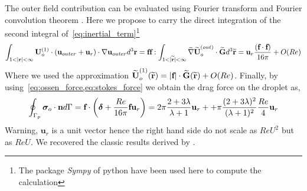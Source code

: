 The outer field contribution can be evaluated using Fourier transform and Fourier convolution theorem \citep{stone2001inertial}. 
Here we propose to carry the direct integration of the second integral of~\ref{eq:inertial_term}\footnote{The package \textit{Sympy} of python have been used here to compute the calculation} 
\begin{equation}
    \int_{1<|\textbf{r}|<\infty}{
    \textbf{U}_{o}^{(1)}\cdot 
    (\textbf{u}_{outer} + \textbf{u}_r)\cdot \grad \textbf{u}_{outer}
    }d^3\textbf{r} 
    =
    \textbf{f} \textbf{f} : \int_{1<|\wt{\textbf{r}}|<\infty}{
    \wt{\grad} \wt{\textbf{U}}_{o}^{(out)}\cdot \wt{\textbf{G}}
    }  d^3 \wt{\textbf{r}}
    =
    \textbf{u}_r\frac{(\textbf{f}\cdot \textbf{f})}{16\pi} + O(Re)
    \label{eq:ossen_force}
\end{equation}
Where we used the approximation $\widetilde{\textbf{U}}_{o}^{(1)}(\widetilde{\textbf{r}}) = |\textbf{f}| \cdot \widetilde{\textbf{G}}(\widetilde{\textbf{r}}) + O(Re)$.
Finally, by using~\ref{eq:ossen_force,eq:stokes_force} we obtain the drag force on the droplet as, 
\begin{equation}
    \intS[p]{\bm\sigma_{o}\cdot \textbf{n}}
    =
    \textbf{f}\cdot 
    \left(
        \bm\delta+ \frac{Re }{16\pi}\textbf{f}\textbf{u}_r
    \right)
    =
    2\pi \frac{2+3\lambda}{\lambda+1}\textbf{u}_r+ 
    + \pi \frac{(2+3\lambda)^2}{(\lambda+1)^2}
        \frac{Re }{4} \textbf{u}_r
    \label{eq:drag_force_application_last}
\end{equation}
Warning, $\textbf{u}_r$ is a unit vector hence the right hand side do not scale as $Re U^2$ but as $Re U$. 
We recovered the classic results derived by \citet{proudman1957expansions}. 

